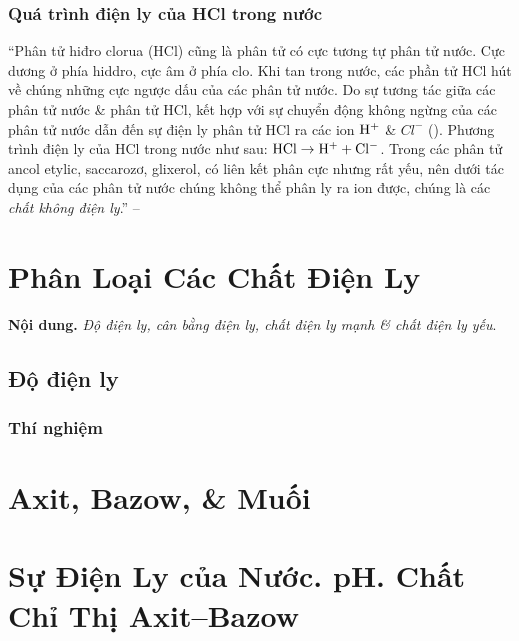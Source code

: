 \documentclass[oneside]{book}
\numberwithin{equation}{section}
\begin{document}
\subsubsection{Quá trình điện ly của HCl trong nước}
``Phân tử hiđro clorua (HCl) cũng là phân tử có cực tương tự phân tử nước. Cực dương ở phía hiddro, cực âm ở phía clo. Khi tan trong nước, các phần tử HCl hút về chúng những cực ngược dấu của các phân tử nước. Do sự tương tác giữa các phân tử nước \& phân tử HCl, kết hợp với sự chuyển động không ngừng của các phân tử nước dẫn đến sự điện ly phân tử HCl ra các ion $\rm H^+$ \& $Cl^-$ (\cite[Hình 1.4: \textsf{Sơ đồ quá  trình phân ly ra ion của phân tử HCl trong nước (Thực tế trong dung dịch $\rm H^+$ luôn tồn tại dưới dạng $\rm H_3O^+$)}, p. 6]{SGK_Hoa_Hoc_11_nang_cao}). Phương trình điện ly của HCl trong nước như sau: $\rm HCl\to H^+ + Cl^-$. Trong các phân tử ancol etylic, saccarozơ, glixerol, có liên kết phân cực nhưng rất yếu, nên dưới tác dụng của các phân tử nước chúng không thể phân ly ra ion được, chúng là các \textit{chất không điện ly}.'' -- \cite[pp. 6--7]{SGK_Hoa_Hoc_11_nang_cao}



\section{Phân Loại Các Chất Điện Ly}
\textbf{Nội dung.} \textit{Độ điện ly, cân bằng điện ly, chất điện ly mạnh \& chất điện ly yếu}.

\subsection{Độ điện ly}

\subsubsection{Thí nghiệm}


\section{Axit, Bazow, \& Muối}


\section{Sự Điện Ly của Nước. pH. Chất Chỉ Thị Axit--Bazow}
\end{document}
